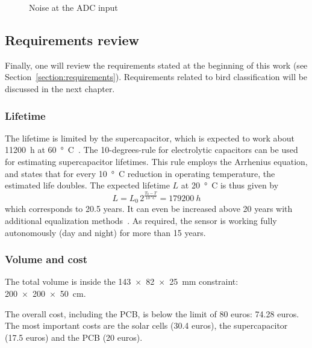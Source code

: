 \documentclass{EPL-master-thesis-covers-EN}
\begin{document}
\begin{figure}[H]
    \centering
    
    \caption{Noise at the ADC input}
    \label{fig:noise_sound}
\end{figure}




    
\subsection*{Requirements review}

Finally, one will review the requirements stated at the beginning of this work (see Section~\ref{section:requirements}). Requirements related to bird classification will be discussed in the next chapter.

\subsubsection*{Lifetime}

The lifetime is limited by the supercapacitor, which is expected to work about \SI{11200}{h} at \SI{60}{\degree C}~\cite{Vishay}.   The 10-degrees-rule for electrolytic capacitors can be used for estimating supercapacitor lifetimes. This rule employs the Arrhenius equation, and states that for every \SI{10}{\degree C} reduction in operating temperature, the estimated life doubles. The expected lifetime $L$ at \SI{20}{\degree C} is thus given by
\[
 L = L_0 \, 2^{\frac{T_0-T}{\SI{10}{\degree C}}} = \SI{179200}{h}
\]
which corresponds to 20.5 years. It can even be increased above 20 years with additional equalization methods~\cite{4494753}. As required, the sensor is working fully autonomously (day and night) for more than 15 years.

\subsubsection*{Volume and cost}

The total volume is inside the \SI{143 x 82 x 25}{mm} constraint: \SI{200 x 200 x 50}{cm}.

The overall cost, including the PCB, is below the limit of 80 euros: 74.28 euros. The most important costs are the solar cells (30.4 euros), the supercapacitor (17.5 euros) and the PCB (20 euros).
\end{document}
